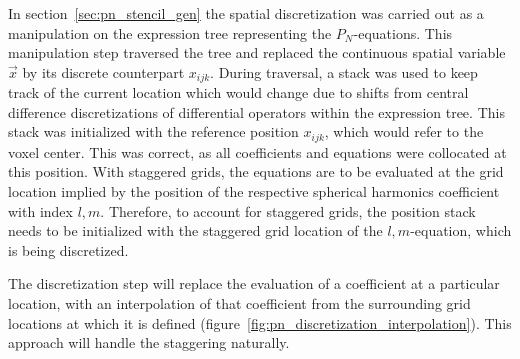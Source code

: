 In section~\ref{sec:pn_stencil_gen} the spatial discretization was carried out as a manipulation on the expression tree representing the $P_N$-equations. This manipulation step traversed the tree and replaced the continuous spatial variable $\vec{x}$ by its discrete counterpart $x_{ijk}$. During traversal, a stack was used to keep track of the current location which would change due to shifts from central difference discretizations of differential operators within the expression tree. This stack was initialized with the reference position $x_{ijk}$, which would refer to the voxel center. This was correct, as all coefficients and equations were collocated at this position. With staggered grids, the equations are to be evaluated at the grid location implied by the position of the respective spherical harmonics coefficient with index $l,m$. Therefore, to account for staggered grids, the position stack needs to be initialized with the staggered grid location of the $l,m$-equation, which is being discretized.

The discretization step will replace the evaluation of a coefficient at a particular location, with an interpolation of that coefficient from the surrounding grid locations at which it is defined (figure~\ref{fig:pn_discretization_interpolation}). This approach will handle the staggering naturally.

